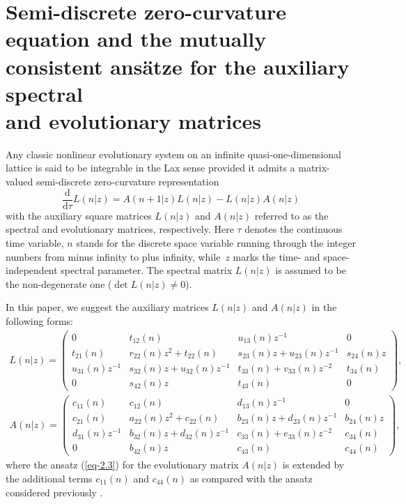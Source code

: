 \documentclass[pdftex]{sigma}
\numberwithin{equation}{section}
\begin{document}
\section[Semi-discrete zero-curvature equation and the mutually consistent ans\"{a}tze for the auxiliary spectral and evolutionary matrices]{Semi-discrete zero-curvature equation and the mutually\\ consistent ans\"{a}tze for the auxiliary spectral\\ and evolutionary matrices}


Any classic nonlinear evolutionary system on an infinite quasi-one-dimensional lattice is said to be integrable in the Lax sense provided it admits a matrix-valued semi-discrete zero-curvature representation \cite{faddeev-HMTS-2007, tu-JPA-23-3903}
\begin{equation}\label{eq-2.1}
	\frac{\mathrm{d}}{\mathrm{d}\tau}L(n|z)=A(n+1|z)L(n|z)-L(n|z)A(n|z)
\end{equation}
with the auxiliary square matrices $L(n|z)$ and $A(n|z)$ referred to as the spectral and evolutionary matrices, respectively.
Here $\tau$ denotes the continuous time variable, $n$ stands for the discrete space variable running through the integer numbers from minus infinity to plus infinity, while~$z$ marks the time- and space-independent spectral parameter. The spectral matrix $L(n|z)$ is assumed to be the non-degenerate one ($\det L(n|z)\neq0$).

In this paper, we suggest the auxiliary matrices $L(n|z)$ and $A(n|z)$ in the following forms:
\begin{gather}\label{eq-2.2}
	L(n|z) = \begin{pmatrix}
		0 & t_{12}(n) & u_{13}(n)z^{-1} & 0 \\
		t_{21}(n) & r_{22}(n)z^{2} + t_{22}(n) & s_{23}(n)z + u_{23}(n)z^{-1} & s_{24}(n)z \\
		u_{31}(n)z^{-1} & s_{32}(n)z + u_{32}(n)z^{-1} & t_{33}(n) + v_{33}(n)z^{-2} & t_{34}(n) \\
		0 & s_{42}(n)z & t_{43}(n) & 0	
	\end{pmatrix},
\\ \label{eq-2.3}
	A(n|z) = \begin{pmatrix}
		c_{11}(n) & c_{12}(n) & d_{13}(n)z^{-1} & 0 \\
		c_{21}(n) & a_{22}(n)z^{2} + c_{22}(n) & b_{23}(n)z + d_{23}(n)z^{-1} & b_{24}(n)z \\
		d_{31}(n)z^{-1} & b_{32}(n)z + d_{32}(n)z^{-1} & c_{33}(n) + e_{33}(n)z^{-2} & c_{34}(n) \\
		0 & b_{42}(n)z & c_{43}(n) & c_{44}(n)
	\end{pmatrix},
\end{gather}
where the ansatz (\ref{eq-2.3}) for the evolutionary matrix $A(n|z)$ is extended by the additional terms $c_{11}(n)$ and $c_{44}(n)$ as compared with the ansatz considered previously \cite{vakhnenko-JNMP-18-401, vakhnenko-JNMP-18-415}.
\end{document}
